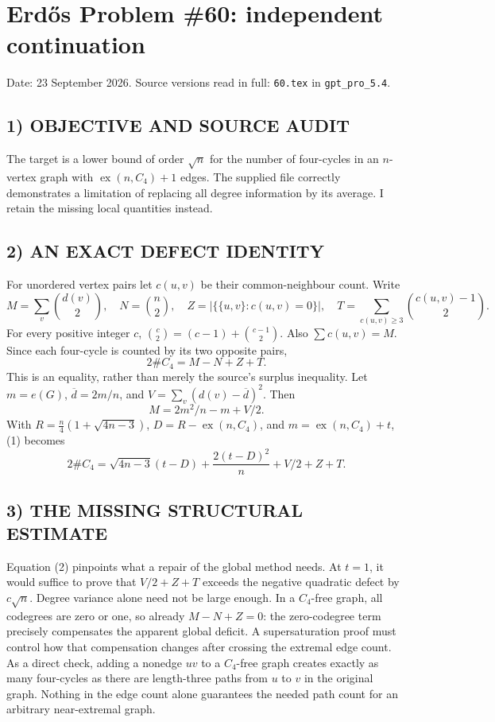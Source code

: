 \section{Erd\H{o}s Problem \#60: independent continuation}
\noindent Date: 23 September 2026. Source versions read in full: \texttt{60.tex} in \texttt{gpt\_pro\_5.4}.

\subsection*{1) OBJECTIVE AND SOURCE AUDIT}
The target is a lower bound of order $\sqrt n$ for the number of four-cycles in an $n$-vertex graph with $\operatorname{ex}(n,C_4)+1$ edges. The supplied file correctly demonstrates a limitation of replacing all degree information by its average. I retain the missing local quantities instead.
\subsection*{2) AN EXACT DEFECT IDENTITY}
For unordered vertex pairs let $c(u,v)$ be their common-neighbour count. Write
\[
M=\sum_v\binom{d(v)}2,\quad N=\binom n2,\quad
Z=|\{\{u,v\}:c(u,v)=0\}|,
\quad T=\sum_{c(u,v)\ge3}\binom{c(u,v)-1}{2}.
\]
For every positive integer $c$, $\binom c2=(c-1)+\binom{c-1}2$. Also $\sum c(u,v)=M$. Since each four-cycle is counted by its two opposite pairs,
\[
\boxed{2\#C_4=M-N+Z+T.} \tag{1}
\]
This is an equality, rather than merely the source's surplus inequality.
Let $m=e(G)$, $\overline d=2m/n$, and $V=\sum_v(d(v)-\overline d)^2$. Then
\[
M=2m^2/n-m+V/2.
\]
With $R=\frac n4(1+\sqrt{4n-3})$, $D=R-\operatorname{ex}(n,C_4)$, and $m=\operatorname{ex}(n,C_4)+t$, (1) becomes
\[
2\#C_4=\sqrt{4n-3}(t-D)+\frac{2(t-D)^2}{n}+V/2+Z+T. \tag{2}
\]
\subsection*{3) THE MISSING STRUCTURAL ESTIMATE}
Equation (2) pinpoints what a repair of the global method needs. At $t=1$, it would suffice to prove that $V/2+Z+T$ exceeds the negative quadratic defect by $c\sqrt n$. Degree variance alone need not be large enough. In a $C_4$-free graph, all codegrees are zero or one, so already $M-N+Z=0$: the zero-codegree term precisely compensates the apparent global deficit. A supersaturation proof must control how that compensation changes after crossing the extremal edge count.
As a direct check, adding a nonedge $uv$ to a $C_4$-free graph creates exactly as many four-cycles as there are length-three paths from $u$ to $v$ in the original graph. Nothing in the edge count alone guarantees the needed path count for an arbitrary near-extremal graph.
